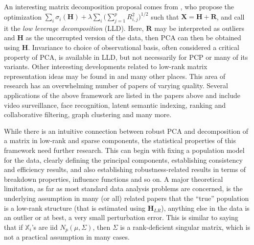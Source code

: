 \documentclass[ss]{imsart}
\newcommand{\BX}{{\mathbb{X}}}
\newcommand{\vecH}{{\mathbf {H}}}
\newcommand{\vecR}{{\mathbf {R}}}
\newcommand{\vecX}{{\mathbf {X}}}
\theoremstyle{Example}
\begin{document}
An interesting matrix decomposition proposal comes from \cite{ref:EJS111123_Tropp_RPCA},
who propose the optimization 
$\sum_{i} \sigma_{i} (\vecH) + \lambda \sum_{i} \bigl( \sum_{j =1}^{p} R_{i, j}^{2} \bigr)^{1/2}$ such that ${\vecX} = \vecH + \vecR$, and call it the \textit{low leverage decomposition} (LLD). Here, $\vecR$ may be interpreted as outliers and $\vecH$ as the uncorrupted version of the data, then PCA can then be obtained using $\vecH$. Invariance to choice of observational basis, often considered a critical property of PCA, is available in LLD, but not necessarily for PCP or many of its variants. Other interesting developments related to low-rank matrix representation ideas may be found in
\cite{ref:SIAMJOpt11572_Chandrasekaran_RPCA, ref:NeurIPS11612_RPCA_Ctype, ref:ICML10663_Liu_RPCA, ref:NIPS102496_RPCA_OutlierPursuit, ref:AISTAT14266_RPCA_Gilad, ref:TransactionsOnSignalProcessing125176_PCA, ref:StatScience12450_PCA, ref:IEEETransactionsOnIT123047_PCA, ref:NIPS13404_PCA, ref:TransactionsInInformationTheory13546_PCA, ref:NIPS141107_Netrapalli_PCA, ref:JMLR14749_Lerman_PCA, ref:ICML1455_PCA, vidal2016robust, ref:IEEETransactionsOnSIgnalProcessing192439_PCA, ref:ICML212739_PCA, ref:ICML212341_PCA} and many other places. This area of research has an overwhelming number of papers of varying quality. Several applications of the above framework are listed in the papers above and include video surveillance, face recognition, latent semantic indexing, ranking and collaborative filtering, graph clustering and many more.

While there is an intuitive connection between robust PCA and decomposition of a matrix in low-rank and sparse components, the statistical properties of this framework need further research. This can begin with fixing a population model for the data, clearly defining the principal components, establishing consistency and efficiency results, and also establishing robustness-related results in terms of breakdown properties, influence functions and so on. A major theoretical limitation, as far as most standard data analysis problems are concerned, is the underlying assumption in many (or all) related papers that the ``true'' population is a low-rank structure (that is estimated using $\vecH_{LR}$), anything else in the data is an outlier or at best, a very small perturbation error. This is similar to saying that if $\BX_{i}$'s are iid $N_{p} (\mu, \Sigma)$, then $\Sigma$ is a rank-deficient singular matrix, which is not a practical assumption in many cases.
\end{document}
